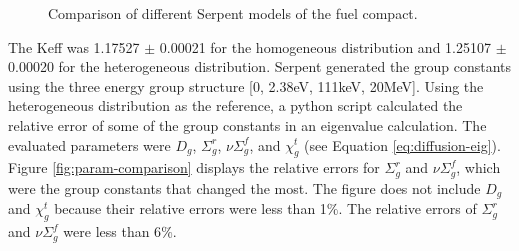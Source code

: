 \begin{figure}[htbp!]
  \centering
  \hfill
  \caption{Comparison of different Serpent models of the fuel compact.}
  \label{fig:compact-model}
\end{figure}

The \gls{Keff} was 1.17527 $\pm$ 0.00021 for the homogeneous distribution and 1.25107 $\pm$ 0.00020 for the heterogeneous distribution.
Serpent generated the group constants using the three energy group structure [0, 2.38eV, 111keV, 20MeV].
Using the heterogeneous distribution as the reference, a python script calculated the relative error of some of the group constants in an eigenvalue calculation.
The evaluated parameters were $D_g$, $\Sigma^r_g$, $\nu\Sigma^f_g$, and $\chi^t_g$ (see Equation \ref{eq:diffusion-eig}).
Figure \ref{fig:param-comparison} displays the relative errors for $\Sigma^r_g$ and $\nu\Sigma^f_g$, which were the group constants that changed the most.
The figure does not include $D_g$ and $\chi^t_g$ because their relative errors were less than 1$\%$.
The relative errors of $\Sigma^r_g$ and $\nu\Sigma^f_g$ were less than 6$\%$.

